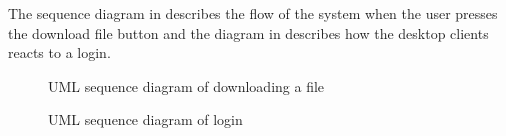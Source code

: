 The sequence diagram in  describes the flow of the system when the user presses the download file button and the diagram in  describes how the desktop clients reacts to a login.

\begin{figure}[htb!]
	\caption{UML sequence diagram of downloading a file}
	\label{fig:des_download-sequence}
\end{figure}

\begin{figure}[htb!]
	\caption{UML sequence diagram of login}
	\label{fig:des_login-sequence}
\end{figure}
\FloatBarrier
